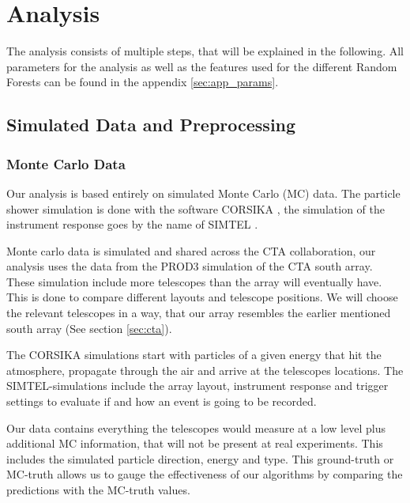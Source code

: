 \chapter{Analysis}
\label{analysis}

The analysis consists of multiple steps, that will be explained in the following.
All parameters for the analysis as well as the features used for the
different Random Forests can be found in the appendix \ref{sec:app_params}.

\section{Simulated Data and Preprocessing}

\subsection{Monte Carlo Data}
Our analysis is based entirely on simulated Monte Carlo (MC) data.
The particle shower simulation is done with the software CORSIKA \cite{heck1998corsika}, 
the simulation of the instrument response goes by the name of SIMTEL \cite{BERNLOHR2008149}.

Monte carlo data is simulated and shared across the CTA collaboration, 
our analysis uses the data from the PROD3 simulation of 
the CTA south array. These simulation include more telescopes 
than the array will eventually have. This is done to compare
different layouts and telescope positions.
We will choose the relevant telescopes in a way, that
our array resembles the earlier mentioned south array (See section \ref{sec:cta}).

The CORSIKA simulations start with particles of a given energy that hit the atmosphere,
propagate through the air and arrive at the telescopes locations.
The SIMTEL-simulations include the array layout, instrument response and trigger settings to
evaluate if and how an event is going to be recorded.

Our data contains everything the telescopes would measure
at a low level
plus additional MC information, that will not be present at real experiments.
This includes the simulated particle direction, energy and type.
This ground-truth or MC-truth allows us to gauge the effectiveness of our 
algorithms by comparing the predictions with the MC-truth values.


